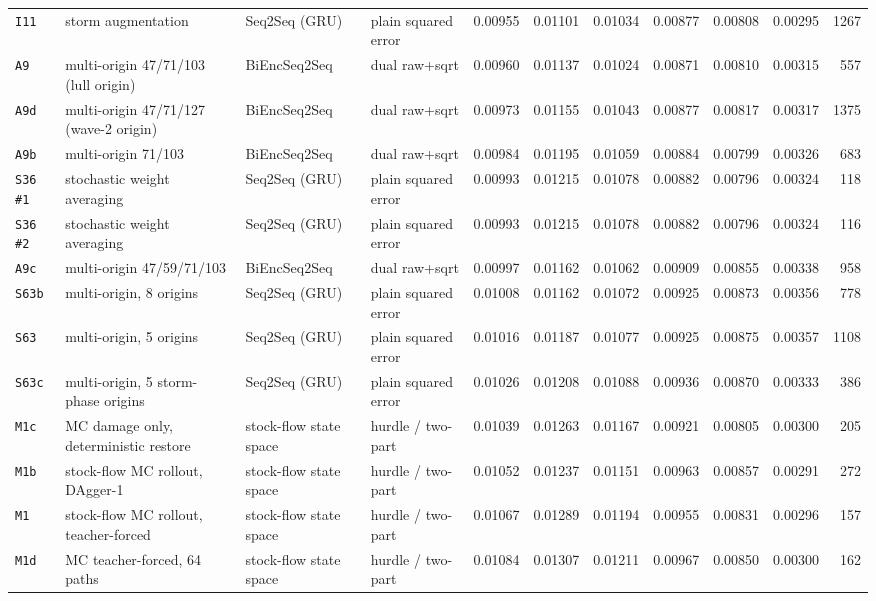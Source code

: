 \documentclass[9pt,landscape]{article}
\begin{document}
\begin{longtable}{@{}p{1.1cm}p{5.4cm}p{3.1cm}p{2.7cm}rrrrrrr@{}}
\texttt{I11} & storm augmentation & Seq2Seq (GRU) & plain squared error & 0.00955 & 0.01101 & 0.01034 & 0.00877 & 0.00808 & 0.00295 & 1267 \\
\texttt{A9} & multi-origin 47/71/103 (lull origin) & BiEncSeq2Seq & dual raw+sqrt & 0.00960 & 0.01137 & 0.01024 & 0.00871 & 0.00810 & 0.00315 & 557 \\
\texttt{A9d} & multi-origin 47/71/127 (wave-2 origin) & BiEncSeq2Seq & dual raw+sqrt & 0.00973 & 0.01155 & 0.01043 & 0.00877 & 0.00817 & 0.00317 & 1375 \\
\texttt{A9b} & multi-origin 71/103 & BiEncSeq2Seq & dual raw+sqrt & 0.00984 & 0.01195 & 0.01059 & 0.00884 & 0.00799 & 0.00326 & 683 \\
\texttt{S36 \#1} & stochastic weight averaging & Seq2Seq (GRU) & plain squared error & 0.00993 & 0.01215 & 0.01078 & 0.00882 & 0.00796 & 0.00324 & 118 \\
\texttt{S36 \#2} & stochastic weight averaging & Seq2Seq (GRU) & plain squared error & 0.00993 & 0.01215 & 0.01078 & 0.00882 & 0.00796 & 0.00324 & 116 \\
\texttt{A9c} & multi-origin 47/59/71/103 & BiEncSeq2Seq & dual raw+sqrt & 0.00997 & 0.01162 & 0.01062 & 0.00909 & 0.00855 & 0.00338 & 958 \\
\texttt{S63b} & multi-origin, 8 origins & Seq2Seq (GRU) & plain squared error & 0.01008 & 0.01162 & 0.01072 & 0.00925 & 0.00873 & 0.00356 & 778 \\
\texttt{S63} & multi-origin, 5 origins & Seq2Seq (GRU) & plain squared error & 0.01016 & 0.01187 & 0.01077 & 0.00925 & 0.00875 & 0.00357 & 1108 \\
\texttt{S63c} & multi-origin, 5 storm-phase origins & Seq2Seq (GRU) & plain squared error & 0.01026 & 0.01208 & 0.01088 & 0.00936 & 0.00870 & 0.00333 & 386 \\
\texttt{M1c} & MC damage only, deterministic restore & stock-flow state space & hurdle / two-part & 0.01039 & 0.01263 & 0.01167 & 0.00921 & 0.00805 & 0.00300 & 205 \\
\texttt{M1b} & stock-flow MC rollout, DAgger-1 & stock-flow state space & hurdle / two-part & 0.01052 & 0.01237 & 0.01151 & 0.00963 & 0.00857 & 0.00291 & 272 \\
\texttt{M1} & stock-flow MC rollout, teacher-forced & stock-flow state space & hurdle / two-part & 0.01067 & 0.01289 & 0.01194 & 0.00955 & 0.00831 & 0.00296 & 157 \\
\texttt{M1d} & MC teacher-forced, 64 paths & stock-flow state space & hurdle / two-part & 0.01084 & 0.01307 & 0.01211 & 0.00967 & 0.00850 & 0.00300 & 162 \\
\bottomrule\end{longtable}
\end{document}
